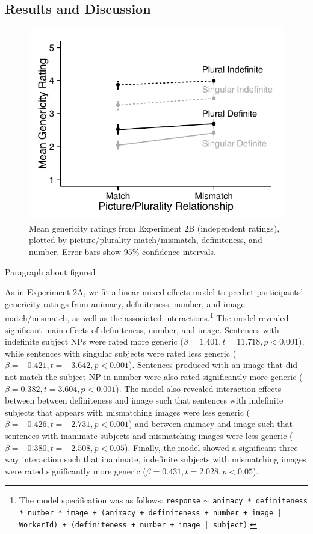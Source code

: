 \documentclass[10pt,letterpaper]{article}
\begin{document}
\subsection{Results and Discussion}


\begin{figure}[t]
\centering
\includegraphics[width=\linewidth]{figures/e2b_mod.pdf}
\caption{\label{fig:e2b} Mean genericity ratings from Experiment 2B (independent ratings), plotted by picture/plurality match/mismatch, definiteness, and number. Error bars show 95\% confidence intervals.} 
\end{figure}
Paragraph about figured

As in Experiment 2A, we fit a linear mixed-effects model to predict participants' genericity ratings from animacy, definiteness, number, and image match/mismatch, as well as the associated interactions.\footnote{The model specification was as follows: \texttt{response} \(\sim\) \texttt{animacy * definiteness * number * image + (animacy + definiteness + number + image | WorkerId) + (definiteness + number + image | subject)}.} The model revealed significant main effects of definiteness, number, and image. Sentences with indefinite subject NPs were rated more generic (\(\beta = 1.401, t = 11.718, p < 0.001\)), while sentences with singular subjects were rated less generic (\(\beta = -0.421, t = -3.642, p < 0.001\)). Sentences produced with an image that did not match the subject NP in number were also rated significantly more generic (\(\beta = 0.382, t = 3.604, p < 0.001\)). The model also revealed interaction effects between between definiteness and image such that sentences with indefinite subjects that appears with mismatching images were less generic (\(\beta = -0.426, t = -2.731, p < 0.001\)) and between animacy and image such that sentences with inanimate subjects and mismatching images were less generic (\(\beta = -0.380, t=-2.508, p<0.05\)). Finally, the model showed a significant three-way interaction such that inanimate, indefinite subjects with mismatching images were rated significantly more generic (\(\beta = 0.431, t = 2.028, p < 0.05\)).
\end{document}
